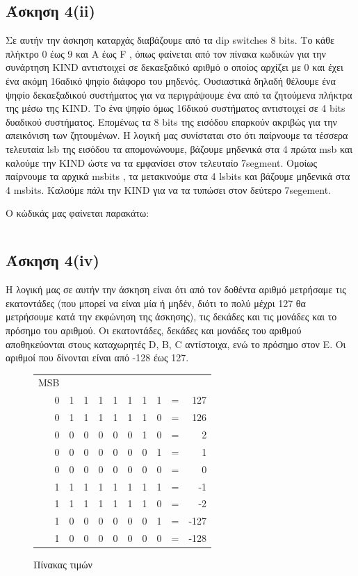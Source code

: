 \documentclass[a4paper,10pt]{article} \usepackage{anysize}
\begin{document}
\subsection*{Άσκηση 4(ii)}
Σε αυτήν την άσκηση καταρχάς διαβάζουμε από τα dip switches 8 bits. Το κάθε
πλήκτρο 0 έως 9 και A έως F , όπως φαίνεται από τον πίνακα κωδικών για την
συνάρτηση KIND αντιστοιχεί σε δεκαεξαδικό αριθμό ο οποίος αρχίζει με 0 και
έχει ένα ακόμη 16αδικό ψηφίο διάφορο του μηδενός. Ουσιαστικά δηλαδή θέλουμε
ένα ψηφίο δεκαεξαδικού συστήματος για να περιγράψουμε ένα από τα ζητούμενα
πλήκτρα της μέσω της KIND. Το ένα ψηφίο όμως 16δικού συστήματος αντιστοιχεί σε
4 bits δυαδικού συστήματος. Επομένως τα 8 bits της εισόδου επαρκούν ακριβώς
για την απεικόνιση των ζητουμένων. Η λογική μας συνίσταται στο ότι παίρνουμε
τα τέσσερα τελευταία lsb της εισόδου τα απομονώνουμε, βάζουμε μηδενικά στα 4
πρώτα msb και καλούμε την KIND ώστε να τα εμφανίσει στον τελευταίο 7segment.
Ομοίως παίρνουμε τα αρχικά msbits , τα μετακινούμε στα 4 lsbits και βάζουμε
μηδενικά στα 4 msbits. Καλούμε πάλι την KIND για να τα τυπώσει στον δεύτερο
7segement.

Ο κώδικάς μας φαίνεται παρακάτω:
\inputminted[linenos,obeytabs,frame=leftline,fontsize=\footnotesize]{oldasm}{files/askhsh_4_ii.8085}
\subsection*{Άσκηση 4(iv)}
Η λογική μας σε αυτήν την άσκηση είναι ότι από τον δοθέντα αριθμό μετρήσαμε
τις εκατοντάδες (που μπορεί να είναι μία ή μηδέν, διότι το πολύ μέχρι 127 θα
μετρήσουμε κατά την εκφώνηση της άσκησης), τις δεκάδες και τις μονάδες και το
πρόσημο του αριθμού. Οι εκατοντάδες, δεκάδες και μονάδες του αριθμού
αποθηκεύονται στους καταχωρητές  D, B, C αντίστοιχα, ενώ το πρόσημο στον E. Οι
αριθμοί που δίνονται είναι από -128 έως 127.\\

\begin{figure}[h]
\centering
\begin{tabular}{r r r r r r r r r r}
MSB &&&&&&&\\
0 & 1 & 1 & 1 & 1 & 1 & 1 & 1 & = & 127\\
0 & 1 & 1 & 1 & 1 & 1 & 1 & 0 & = & 126\\
0 & 0 & 0 & 0 & 0 & 0 & 1 & 0 & = & 2\\
0 & 0 & 0 & 0 & 0 & 0 & 0 & 1 & = & 1\\
0 & 0 & 0 & 0 & 0 & 0 & 0 & 0 & = & 0\\
1 & 1 & 1 & 1 & 1 & 1 & 1 & 1 & = & -1\\
1 & 1 & 1 & 1 & 1 & 1 & 1 & 0 & = & -2\\
1 & 0 & 0 & 0 & 0 & 0 & 0 & 1 & = & -127\\
1 & 0 & 0 & 0 & 0 & 0 & 0 & 0 & = & -128\\
\end{tabular}
\caption{Πίνακας τιμών}
\end{figure}
\end{document}
